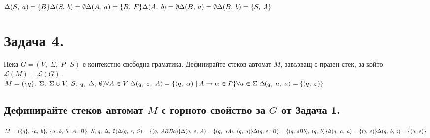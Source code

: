 \documentclass[12pt]{article}
\newcommand{\Lang}{\mathcal{L}}
\begin{document}
$\Delta(S, \; a) = \{B\} \\\\
\Delta(S, \; b) = \emptyset \\\\
\Delta(A, \; a) = \{B, \; F\} \\\\
\Delta(A, \; b) = \emptyset \\\\
\Delta(B, \; a) = \emptyset \\\\
\Delta(B, \; b) = \{S, \; A\}$ \\


\section{Задача 4.}

Нека $G = (V, \; \Sigma, \; P, \; S)$ е контекстно-свободна граматика.
Дефинирайте стеков автомат $M$, завърващ с празен стек, за който $\Lang(M) = \Lang(G)$. \\

$M = (\{q\}, \; \Sigma, \; \Sigma \cup V, \; S, \; q, \; \Delta, \; \emptyset) \\\\
\forall A \in V \; \Delta(q, \; \varepsilon, \; A) = \{(q, \; \alpha) \; | \; A \to \alpha \in P\} \\\\
\forall a \in \Sigma \; \Delta(q, \; a, \; a) = \{(q, \; \varepsilon)\}$


\subsection{Дефинирайте стеков автомат $M$ с горното свойство за $G$ от Задача 1.}

$M = (\{q\}, \; \{a, \; b\}, \; \{a, \; b, \; S, \; A, \; B\}, \; S, \; q, \; \Delta, \; \emptyset) \\\\
\Delta(q, \; \varepsilon, \; S) = \{(q, \; ABBa)\} \\\\
\Delta(q, \; \varepsilon, \; A) = \{(q, \; aA), \; (q, \; a)\} \\\\
\Delta(q, \; \varepsilon, \; B) = \{(q, \; bBb), \; (q, \; b)\} \\\\
\Delta(q, \; a, \; a) = \{(q, \; \varepsilon)\} \\\\
\Delta(q, \; b, \; b) = \{(q, \; \varepsilon)\}$
\end{document}
